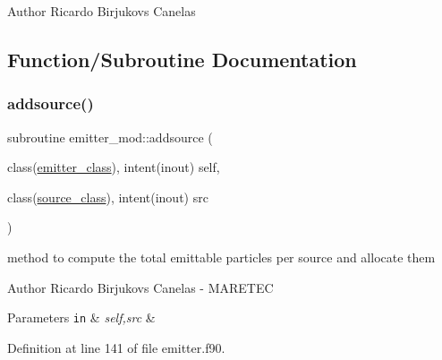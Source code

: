\begin{DoxyAuthor}{Author}
Ricardo Birjukovs Canelas 
\end{DoxyAuthor}


\subsection{Function/\+Subroutine Documentation}
\mbox{\label{namespaceemitter__mod_ab704fb0e2eb9b3b4b9542706b6fb4eaf}} 
\subsubsection{\texorpdfstring{addsource()}{addsource()}}
{\footnotesize\ttfamily subroutine emitter\+\_\+mod\+::addsource (\begin{DoxyParamCaption}\item[{class(\mbox{\hyperlink{structemitter__mod_1_1emitter__class}{emitter\+\_\+class}}), intent(inout)}]{self,  }\item[{class(\mbox{\hyperlink{structsources__mod_1_1source__class}{source\+\_\+class}}), intent(inout)}]{src }\end{DoxyParamCaption})\hspace{0.3cm}{\ttfamily [private]}}



method to compute the total emittable particles per source and allocate them 

\begin{DoxyAuthor}{Author}
Ricardo Birjukovs Canelas -\/ M\+A\+R\+E\+T\+EC
\end{DoxyAuthor}

\begin{DoxyParams}[1]{Parameters}
\mbox{\tt in}  & {\em self,src} & \\
\hline
\end{DoxyParams}


Definition at line 141 of file emitter.\+f90.



